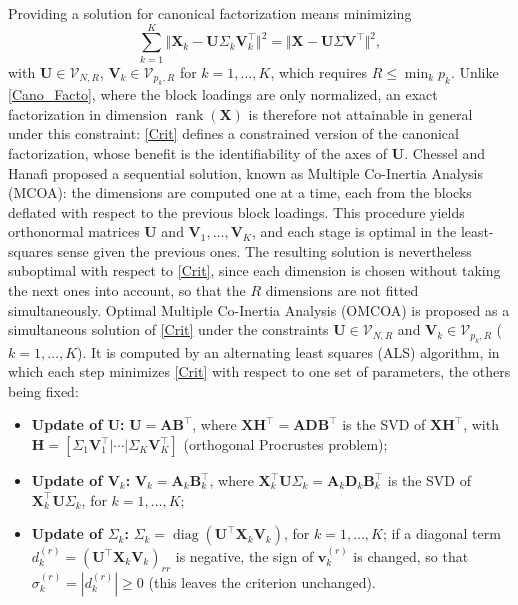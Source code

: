 \documentclass[11pt]{article}
\DeclareMathOperator{\diag}{diag}
\DeclareMathOperator{\rank}{rank}
\newcommand{\X}{\mathbf{X}}
\newcommand{\U}{\mathbf{U}}
\newcommand{\V}{\mathbf{V}}
\newcommand{\vv}{\mathbf{v}}
\newcommand{\Stiefel}[2]{\mathcal V_{#1,#2}}
\begin{document}
Providing a solution for canonical factorization means minimizing
\begin{equation}
	\sum_{k=1}^K\Vert \X_k - \U\Sigma_k \V_k^\intercal\Vert^2= \Vert \X- \U \Sigma \V^\intercal\Vert^2, \label{Crit}
\end{equation}
with $\U\in\Stiefel{N}{R}$, $\V_k\in\Stiefel{p_k}{R}$ for $k=1,\ldots,K$, which requires $R\leq\min_kp_k$. Unlike \eqref{Cano_Facto}, where the block loadings are only normalized, an exact factorization in dimension $\rank(\X)$ is therefore not attainable in general under this constraint: \eqref{Crit} defines a constrained version of the canonical factorization, whose benefit is the identifiability of the axes of $\U$. 
Chessel and Hanafi \cite{chessel1996} proposed a sequential solution, known as Multiple Co-Inertia Analysis (MCOA): the dimensions are computed one at a time, each from the blocks deflated with respect to the previous block loadings. This procedure yields orthonormal matrices $\U$ and $\V_1,\ldots,\V_K$, and each stage is optimal in the
least-squares sense given the previous ones. The resulting solution is nevertheless suboptimal with respect to \eqref{Crit}, since each dimension is chosen without taking the next ones into account, so that the $R$ dimensions are not fitted simultaneously.
Optimal Multiple Co-Inertia Analysis (OMCOA) is proposed as a simultaneous solution of \eqref{Crit} under the constraints $\U\in \Stiefel{N}{R}$ and $\V_k\in \Stiefel{p_k}{R}$ ($k=1,\ldots,K$). It is computed by an alternating least squares (ALS) algorithm, in which each step minimizes \eqref{Crit} with respect to one set of parameters, the others being fixed:
\begin{itemize}
  \item \textbf{Update of $\U$:} $\U=\mathbf A\mathbf B^\intercal$, where $\X\mathbf H^\intercal=\mathbf A\mathbf D\mathbf B^\intercal$ is the SVD of
        $\X\mathbf H^\intercal$, with $\mathbf H=[\Sigma_1\V_1^\intercal|\cdots|\Sigma_K\V_K^\intercal]$ (orthogonal Procrustes problem);
  \item \textbf{Update of $\V_k$:} $\V_k=\mathbf A_k\mathbf B_k^\intercal$, where $\X_k^\intercal\U\Sigma_k=\mathbf A_k\mathbf D_k\mathbf B_k^\intercal$
        is the SVD of $\X_k^\intercal\U\Sigma_k$, for $k=1,\ldots,K$;
  \item \textbf{Update of $\Sigma_k$:} $\Sigma_k=\diag(\U^\intercal\X_k\V_k)$, for $k=1,\ldots,K$; if a diagonal term $d_k^{(r)}=(\U^\intercal\X_k\V_k)_{rr}$ is negative, the sign of $\vv_k^{(r)}$ is changed, so that $\sigma_k^{(r)}=|d_k^{(r)}|\geq0$ (this leaves the criterion unchanged).
\end{itemize}
\end{document}
